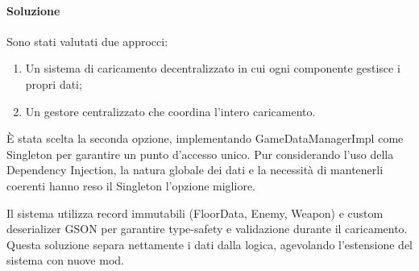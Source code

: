 \documentclass[a4paper,12pt]{report}
\begin{document}
\paragraph{Soluzione} Sono stati valutati due approcci:
\begin{enumerate}
    \item Un sistema di caricamento decentralizzato in cui ogni componente gestisce i propri dati;
    \item Un gestore centralizzato che coordina l'intero caricamento.
\end{enumerate}
È stata scelta la seconda opzione, implementando GameDataManagerImpl come Singleton per garantire un punto d'accesso unico. Pur considerando l'uso della Dependency Injection, la natura globale dei dati e la necessità di mantenerli coerenti hanno reso il Singleton l'opzione migliore.

Il sistema utilizza record immutabili (FloorData, Enemy, Weapon) e custom deserializer GSON per garantire type-safety e validazione durante il caricamento. Questa soluzione separa nettamente i dati dalla logica, agevolando l'estensione del sistema con nuove mod.
\end{document}
